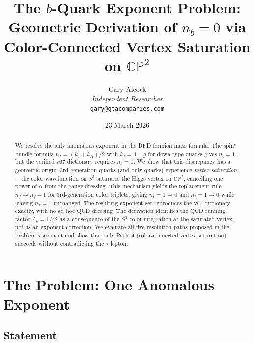 \documentclass[11pt,a4paper]{article}
\newcommand{\CP}{\mathbb{CP}}
\theoremstyle{definition}
\theoremstyle{remark}
\begin{document}
\title{The $b$-Quark Exponent Problem:\\
Geometric Derivation of $n_b = 0$ via\\
Color-Connected Vertex Saturation on $\CP^2$}

\author{Gary Alcock\\
\textit{Independent Researcher}\\
\texttt{gary@gtacompanies.com}}

\date{23 March 2026}

\maketitle

\begin{abstract}
We resolve the only anomalous exponent in the DFD fermion mass formula.  The
spin$^c$ bundle formula $n_f = (k_f + k_H)/2$ with $k_f = 4-g$ for down-type
quarks gives $n_b = 1$, but the verified v67 dictionary requires $n_b = 0$.
We show that this discrepancy has a geometric origin: 3rd-generation quarks
(and only quarks) experience \emph{vertex saturation}---the color wavefunction
on $S^3$ saturates the Higgs vertex on $\CP^2$, cancelling one power of
$\alpha$ from the gauge dressing.  This mechanism yields the replacement rule
$n_f \to n_f - 1$ for 3rd-generation color triplets, giving $n_t = 1 \to 0$
and $n_b = 1 \to 0$ while leaving $n_\tau = 1$ unchanged.  The resulting
exponent set reproduces the v67 dictionary exactly, with no ad hoc QCD
dressing.  The derivation identifies the QCD running factor $A_b = 1/42$
as a consequence of the $S^3$ color integration at the saturated vertex,
not as an exponent correction.  We evaluate all five resolution paths
proposed in the problem statement and show that only Path~4 (color-connected
vertex saturation) succeeds without contradicting the $\tau$ lepton.
\end{abstract}

\tableofcontents

\section{The Problem: One Anomalous Exponent}
\label{sec:problem}

\subsection{Statement}
\end{document}
